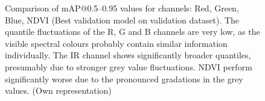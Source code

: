 \begin{figure}[htbp]
    \centering
    
    \caption[Comparison of \acrshort{mAP}@0.5--0.95 values for channels: red, green, blue, ndvi (Best validation model on validation dataset)]{Comparison of \acrshort{mAP}@0.5--0.95 values for channels: Red, Green, Blue, NDVI (Best validation model on validation dataset). The quantile fluctuations of the R, G and B channels are very low, as the visible spectral colours probably contain similar information individually. The IR channel shows significantly broader quantiles, presumably due to stronger grey value fluctuations. NDVI perform significantly worse due to the pronounced gradations in the grey values. (Own representation)}
    \label{fig:ablation_map50-95:val_on_val}
\end{figure}

